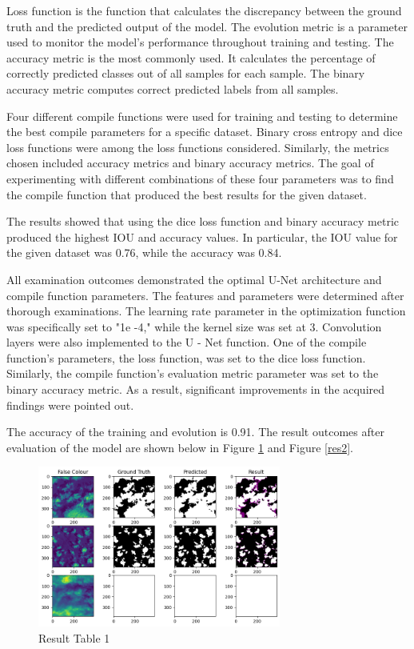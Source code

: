 \documentclass[conference]{IEEEtran}
\begin{document}
\begin{itemize}
        Loss function is the function that calculates the discrepancy between the ground truth and the predicted output of the model. The evolution metric is a parameter used to monitor the model's performance throughout training and testing. The accuracy metric is the most commonly used. It calculates the percentage of correctly predicted classes out of all samples for each sample. The binary accuracy metric computes correct predicted labels from all samples. 

        Four different compile functions were used for training and testing to determine the best compile parameters for a specific dataset. Binary cross entropy and dice loss functions were among the loss functions considered. Similarly, the metrics chosen included accuracy metrics and binary accuracy metrics. The goal of experimenting with different combinations of these four parameters was to find the compile function that produced the best results for the given dataset.

        The results showed that using the dice loss function and binary accuracy metric produced the highest IOU and accuracy values. In particular, the IOU value for the given dataset was 0.76, while the accuracy was 0.84.
\end{itemize}

All examination outcomes demonstrated the optimal U-Net architecture and compile function parameters. The features and parameters were determined after thorough examinations. The learning rate parameter in the optimization function was specifically set to "1e -4," while the kernel size was set at 3. Convolution layers were also implemented to the U - Net function. One of the compile function's parameters, the loss function, was set to the dice loss function. Similarly, the compile function's evaluation metric parameter was set to the binary accuracy metric. As a result, significant improvements in the acquired findings were pointed out.


The accuracy of the training and evolution is 0.91. The result outcomes after evaluation of the model are shown below in Figure \ref{res1} and Figure \ref{res2}.

\begin{figure}[htp]
    \centering
    \includegraphics[width=8cm]{images/result1.png}
    \caption{Result Table 1}
    \label{res1}
\end{figure}
\end{document}
